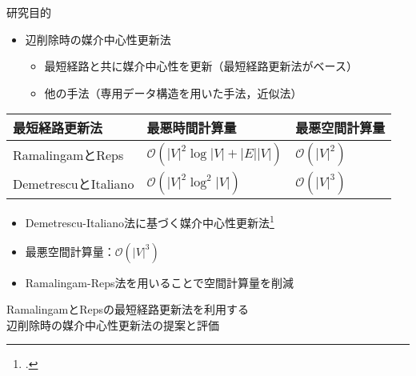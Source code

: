 \documentclass[dvipdfmx,fleqn]{beamer}
\begin{document}
\begin{frame}{研究目的}
  \begin{itemize}
  \item 辺削除時の媒介中心性更新法
    \begin{itemize}
    \item 最短経路と共に媒介中心性を更新（\alert{最短経路更新法}がベース）
    \item 他の手法（専用データ構造を用いた手法，近似法）
    \end{itemize}
  \end{itemize}
  \begin{center}
    \small
    \begin{tabular}{lll}
      \hline
      最短経路更新法 & 最悪時間計算量 & \alert{最悪空間計算量} \\ \hline
      RamalingamとReps\cite{24Ramalingam1996} & $\mathcal{O}(|V|^2\log|V|+|E||V|)$ & $\mathcal{O}(|V|^2)$ \\ \hline
      DemetrescuとItaliano\cite{28Demetrescu2003} & $\mathcal{O}(|V|^2\log^2|V|)$ & $\mathcal{O}(|V|^3)$ \\ \hline
    \end{tabular}
  \end{center}
  \begin{itemize}
  \item Demetrescu-Italiano法に基づく媒介中心性更新法\footcite{29Nasre2014b}
  \item[] 最悪空間計算量：$\mathcal{O}(|V|^3)$
  \item Ramalingam-Reps法を用いることで\alert{空間計算量を削減}
  \end{itemize}
  \begin{block}{}
    RamalingamとRepsの最短経路更新法を利用する \\
    辺削除時の媒介中心性更新法の提案と評価
  \end{block}
\end{frame}
  
\end{document}
